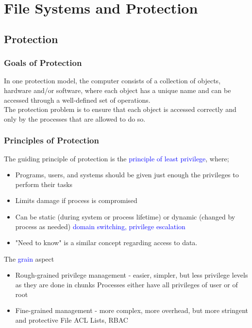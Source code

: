 \documentclass{book/custombook}
\begin{document}
    \chapter{File Systems and Protection}
        \section{Protection}
            \subsection{Goals of Protection}
                In one protection model, the computer consists of a collection of objects, hardware and/or software, where each object has a unique
                name and can be accessed through a well-defined set of operations.\\
                The protection problem is to ensure that each object is accessed correctly and only by the processes that are allowed to do so.
            \subsection{Principles of Protection}
                The guiding principle of protection is the \textcolor{blue}{principle of least privilege}, where;
                \begin{itemize}
                    \item Programs, users, and systems should be given just enough the privileges to perform their tasks
                    \item Limits damage if process is compromised
                    \item Can be static (during system or process lifetime) or dynamic (changed by process as needed) \textcolor{blue}{domain switching,
                    privilege escalation}
                    \item "Need to know" is a similar concept regarding access to data.
                \end{itemize}
                The \textcolor{blue}{grain} aspect
                \begin{itemize}
                    \item Rough-grained privilege management - easier, simpler, but less privilege levels as they are done in chunks
                        \subitem Processes either have all privileges of user or of root
                    \item Fine-grained management - more complex, more overhead, but more stringent and protective
                        \subitem File ACL Lists, RBAC
                \end{itemize}
\end{document}
